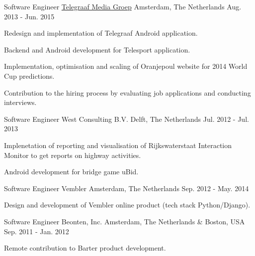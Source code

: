 \begin{cventries}
  \cventry
    {Software Engineer} %
    {\href{https://www.tmg.nl/nl}{Telegraaf Media Groep}} %
    {Amsterdam, The Netherlands} %
    {Aug. 2013 - Jun. 2015} %
    {
      \begin{cvitems} %
        \item {Redesign and implementation of Telegraaf Android application.}
        \item {Backend and Android development for Telesport application.}
        \item {Implementation, optimisation and scaling of Oranjepoul website for 2014 World Cup predictions.}
        \item {Contribution to the hiring process by evaluating job applications and conducting interviews.}
      \end{cvitems}
    }

  \cventry
    {Software Engineer} %
    {West Consulting B.V.} %
    {Delft, The Netherlands} %
    {Jul. 2012 - Jul. 2013} %
    {
      \begin{cvitems} %
        \item {Implenetation of reporting and visualisation of Rijkswaterstaat Interaction Monitor to get reports on highway activities.}
        \item {Android development for bridge game uBid.}
      \end{cvitems}
    }

  \cventry
    {Software Engineer} %
    {Vembler} %
    {Amsterdam, The Netherlands} %
    {Sep. 2012 - May. 2014} %
    {
      \begin{cvitems} %
        \item {Design and development of Vembler online product (tech stack Python/Django).}
      \end{cvitems}
    }

  \cventry
    {Software Engineer} %
    {Beonten, Inc.} %
    {Amsterdam, The Netherlands \& Boston, USA} %
    {Sep. 2011 - Jan. 2012} %
    {
      \begin{cvitems} %
        \item {Remote contribution to Barter product development.}
      \end{cvitems}
    }


\end{cventries}
